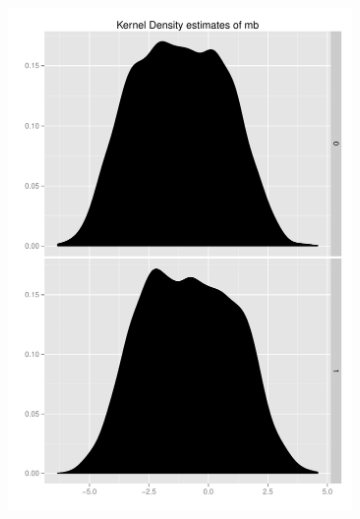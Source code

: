 \documentclass[11pt,letterpaper]{article}
\begin{document}
\begin{figure}[h]
    \begin{subfigure}[b]{0.3\textwidth}\centering \includegraphics[width=1\textwidth]{mb} \end{subfigure}

\end{figure}
\end{document}
